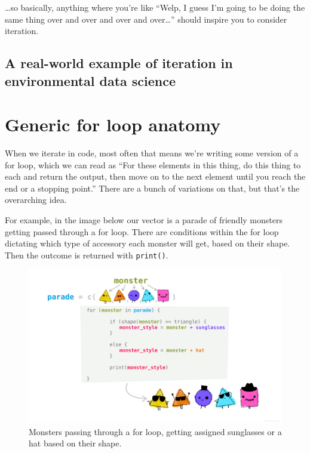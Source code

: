 \documentclass[
]{book}
\begin{document}
\ldots so basically, anything where you're like ``Welp, I guess I'm going to be doing the same thing over and over and over and over\ldots{}'' should inspire you to consider iteration.

\hypertarget{a-real-world-example-of-iteration-in-environmental-data-science}{%
\subsection{A real-world example of iteration in environmental data science}\label{a-real-world-example-of-iteration-in-environmental-data-science}}

\hypertarget{generic-for-loop-anatomy}{%
\section{Generic for loop anatomy}\label{generic-for-loop-anatomy}}

When we iterate in code, most often that means we're writing some version of a for loop, which we can read as ``For these elements in this thing, do this thing to each and return the output, then move on to the next element until you reach the end or a stopping point.'' There are a bunch of variations on that, but that's the overarching idea.

For example, in the image below our vector is a parade of friendly monsters getting passed through a for loop. There are conditions within the for loop dictating which type of accessory each monster will get, based on their shape. Then the outcome is returned with \texttt{print()}.

\begin{figure}
\centering
\includegraphics[width=6.96875in,height=\textheight]{images/for_loop_monsters.png}
\caption{Monsters passing through a for loop, getting assigned sunglasses or a hat based on their shape.}
\end{figure}
\end{document}
